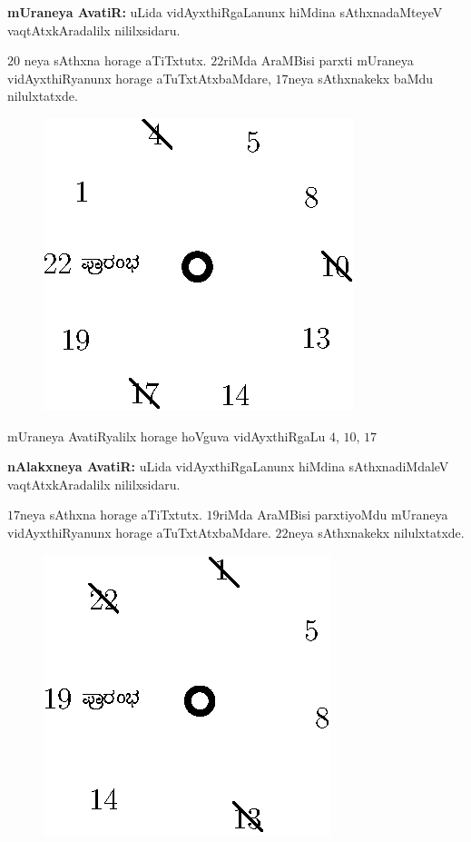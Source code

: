 {\bf mUraneya AvatiR:} uLida vidAyxthiRgaLanunx hiMdina sAthxnadaMteyeV vaqtAtxkAradalilx nililxsidaru.

$20$ neya sAthxna horage aTiTxtutx. $22$riMda AraMBisi parxti mUraneya vidAyxthiRyanunx horage aTuTxtAtxbaMdare, $17$neya sAthxnakekx baMdu nilulxtatxde. 
\begin{figure}[H]
\centering
\includegraphics[scale=0.8]{src/figures/fig11.eps}
\end{figure}

mUraneya AvatiRyalilx horage hoVguva vidAyxthiRgaLu $4$, $10$, $17$ 

{\bf nAlakxneya AvatiR:} uLida vidAyxthiRgaLanunx hiMdina sAthxnadiMdaleV vaqtAtxkAra\-dalilx nililxsidaru.

$17$neya sAthxna horage aTiTxtutx. $19$riMda AraMBisi parxtiyoMdu mUraneya vidAyxthiRyanunx horage aTuTxtAtxbaMdare. $22$neya sAthxnakekx nilulxtatxde. 
\begin{figure}[H]
\centering
\includegraphics[scale=0.8]{src/figures/fig12.eps}
\end{figure}


